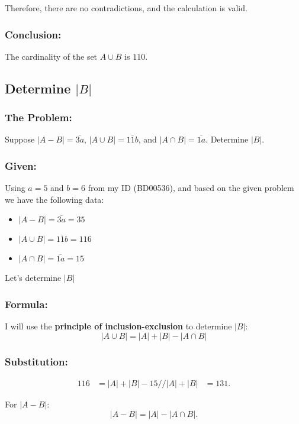 \documentclass[12pt, a4paper, twoside]{report} %
\begin{document}
Therefore, there are no contradictions, and the calculation is valid.

\subsubsection*{Conclusion:}
The cardinality of the set \( A \cup B \) is $\boxed{110}$.


\subsection{Determine $| B |$}

\subsubsection*{The Problem:}
  Suppose $|A-B|=\overline{3a}$, $|A \cup B|=\overline {11b}$, and $|A \cap B|=\overline{1a}$. Determine $|B|$.

\subsubsection*{Given:}
  Using \(a = 5\) and \(b = 6\) from my ID (BD00536), and based on the given problem we have the following data:
  \begin{itemize}
    \item $\vert A - B \vert = \overline{3a} = 35$
    \item $\vert A \cup B \vert = \overline{11b} = 116$
    \item $\vert A \cap B \vert = \overline{1a} = 15$
  \end{itemize}
  Let's determine $|B|$

\subsubsection*{Formula:}
  I will use the \textbf{principle of inclusion-exclusion} to determine $|B|$:
    \[
    |A \cup B| = |A| + |B| - |A \cap B| \tag{1}
    \]

\subsubsection*{Substitution:}
  \begin{align*}
    116 &= |A| + |B| - 15 //
    |A| + |B| &= 131. \tag{2}
  \end{align*}

  For \( |A - B| \):
  \[
  |A - B| = |A| - |A \cap B|.
  \]
\end{document}
